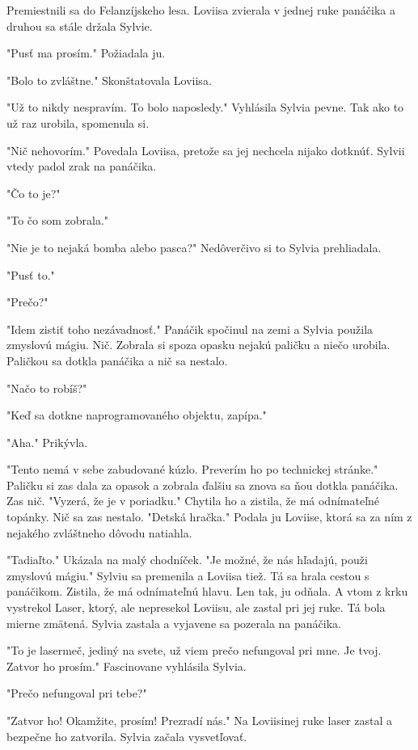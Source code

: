 \documentclass{book}
\begin{document}
Premiestnili sa do Felanzíjskeho lesa. Loviisa zvierala v jednej ruke panáčika a druhou sa stále držala Sylvie.

"$ $Pusť ma prosím."$ $  Požiadala ju.

"$ $Bolo to zvláštne."$ $  Skonštatovala Loviisa.

"$ $Už to nikdy nespravím. To bolo naposledy."$ $  Vyhlásila Sylvia pevne. Tak ako to už raz urobila, spomenula si.

"$ $Nič nehovorím."$ $  Povedala Loviisa, pretože sa jej nechcela nijako dotknúť. Sylvii vtedy padol zrak na panáčika.

"$ $Čo to je?"$ $ 

"$ $To čo som zobrala."$ $ 

"$ $Nie je to nejaká bomba alebo pasca?"$ $  Nedôverčivo si to Sylvia prehliadala.

"$ $Pusť to."$ $ 

"$ $Prečo?"$ $ 

"$ $Idem zistiť toho nezávadnosť."$ $  Panáčik spočinul na zemi a Sylvia použila zmyslovú mágiu. Nič. Zobrala si spoza opasku nejakú paličku a niečo urobila. Paličkou sa dotkla panáčika a nič sa nestalo.

"$ $Načo to robíš?"$ $ 

"$ $Keď sa dotkne naprogramovaného objektu, zapípa."$ $ 

"$ $Aha."$ $  Prikývla.

"$ $Tento nemá v sebe zabudované kúzlo. Preverím ho po technickej stránke."$ $  Paličku si zas dala za opasok a zobrala ďalšiu sa znova sa ňou dotkla panáčika. Zas nič. "$ $Vyzerá, že je v poriadku."$ $  Chytila ho a zistila, že má odnímateľné topánky. Nič sa zas nestalo. "$ $Detská hračka."$ $  Podala ju Loviise, ktorá sa za ním z nejakého zvláštneho dôvodu natiahla.

"$ $Tadiaľto."$ $  Ukázala na malý chodníček. "$ $Je možné, že nás hľadajú, použi zmyslovú mágiu."$ $  Sylviu sa premenila a Loviisa tiež. Tá sa hrala cestou s panáčikom. Zistila, že má odnímateľnú hlavu. Len tak, ju odňala. A vtom z krku vystrekol Laser, ktorý, ale nepresekol Loviisu, ale zastal pri jej ruke. Tá bola mierne zmätená. Sylvia zastala a vyjavene sa pozerala na panáčika.

"$ $To je lasermeč, jediný na svete, už viem prečo nefungoval pri mne. Je tvoj. Zatvor ho prosím."$ $  Fascinovane vyhlásila Sylvia.

"$ $Prečo nefungoval pri tebe?"$ $ 

"$ $Zatvor ho! Okamžite, prosím! Prezradí nás."$ $  Na Loviisinej ruke laser zastal a bezpečne ho zatvorila. Sylvia začala vysvetľovať.
\end{document}
